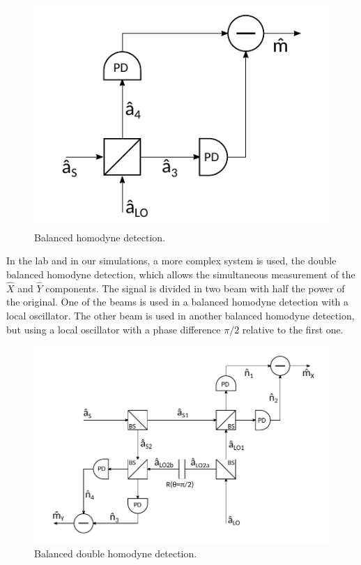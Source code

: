 \begin{figure}[H]
\label{fig:scheme_homodyne}
\centering
\includegraphics{./sdf/quantum_noise/figures/scheme_homodyne.pdf}
\caption{Balanced homodyne detection.}
\end{figure}
%
In the lab and in our simulations, a more complex system is used, the double balanced homodyne detection, which allows the simultaneous measurement of the $\hat{X}$ and $\hat{Y}$ components. The signal is divided in two beam with half the power of the original. One of the beams is used in a balanced homodyne detection with a local oscillator. The other beam is used in another balanced homodyne detection, but using a local oscillator with a phase difference $\pi/2$ relative to the first one.
%
\begin{figure}[H]
\label{fig:scheme_homodyne}
\centering
\includegraphics{./sdf/quantum_noise/figures/scheme_double_homodyne.pdf}
\caption{Balanced double homodyne detection.}
\end{figure}
%
%
%
